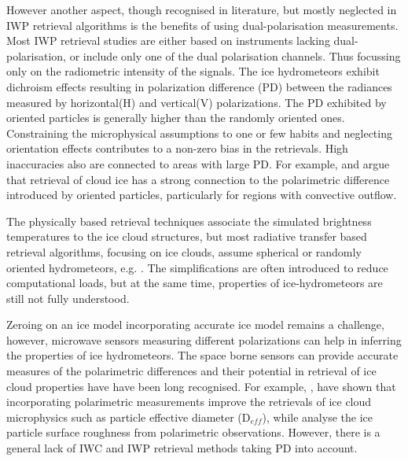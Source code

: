 \documentclass[amt, manuscript]{copernicus}
\begin{document}
However another aspect, though recognised in literature, but mostly neglected in IWP retrieval algorithms is the benefits of using dual-polarisation measurements. Most IWP retrieval studies are either based on instruments lacking dual-polarisation, or include only one of the dual polarisation channels. Thus focussing only on the radiometric intensity of the signals. The ice hydrometeors exhibit dichroism effects resulting in polarization difference (PD) between the radiances measured by horizontal(H) and vertical(V) polarizations. The PD exhibited by oriented particles is generally higher than the randomly oriented ones. Constraining the microphysical assumptions to one or few habits and neglecting  orientation effects contributes to a non-zero bias in the retrievals. High inaccuracies also are connected to areas with large PD. For example, \citet{gong:micro:17} and \citep{miao:thepo:03} argue that retrieval of cloud ice has a strong connection to the polarimetric difference introduced by oriented particles, particularly for regions with convective outflow. 

The physically based retrieval techniques associate the simulated brightness temperatures to the ice cloud structures, but most radiative transfer based retrieval algorithms, focusing on ice clouds, assume spherical or randomly oriented hydrometeors, e.g. \citep{evans:icecl:05, Zhao:retri:02}. The simplifications are often introduced to reduce computational loads, but at the same time, properties of ice-hydrometeors are still not fully understood.


Zeroing on an ice model incorporating accurate ice model remains a challenge, however, microwave sensors measuring different polarizations can help in inferring the properties of ice hydrometeors. The space borne sensors can provide accurate measures of the polarimetric differences and their potential in retrieval of ice cloud properties have have been long recognised. For example, \citep{coy:sensi:20}, have shown  that incorporating polarimetric measurements improve the retrievals of ice cloud microphysics such as particle effective diameter (D$_{eff}$), while \citep{hioki:degre:16} analyse the ice particle surface roughness from polarimetric observations. However, there is a general lack of  IWC and IWP retrieval methods taking PD into account.
\end{document}
